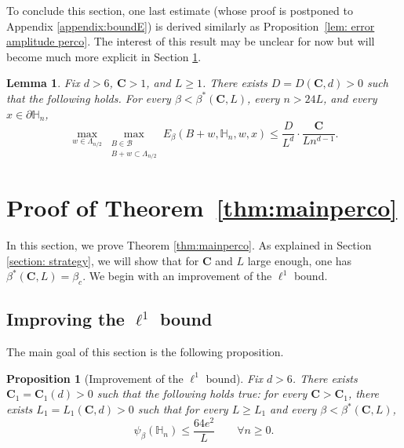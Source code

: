 \documentclass[11pt,a4paper]{article}
\numberwithin{equation}{section}
\theoremstyle{plain}
\newtheorem{Lem}[Thm]{Lemma}
\newtheorem{Prop}[Thm]{Proposition}
\theoremstyle{definition}
\newcommand\bfC{\mathbf{C}}
\begin{document}
To conclude this section, one last estimate (whose proof is postponed to Appendix \ref{appendix:boundE}) is derived similarly as Proposition~\ref{lem: error amplitude perco}. The interest of this result may be unclear for now but will become much more explicit in Section \ref{section: proof mainperco}.
\begin{Lem}\label{lem: estimate E(x)} Fix $d>6$, $\bfC>1$, and $L\geq 1$. 
There exists $D=D(\bfC,d)>0$ such that the following holds. For every $\beta<\beta^*(\bfC,L)$, every $n> 24L$, and every $x\in \partial\mathbb H_n$,
\begin{equation}
\max_{w\in \Lambda_{n/2}}\max_{\substack{B\in \mathcal B\\B+w\subset \Lambda_{n/2}}}E_\beta(B+w,\mathbb H_n,w,x)\leq \frac{D}{L^{d}}\cdot\frac{\bfC}{Ln^{d-1}}.
\end{equation}
	
\end{Lem}


\section{Proof of Theorem~\ref{thm:mainperco}}\label{section: proof mainperco}\label{sec:3}

In this section, we prove Theorem \ref{thm:mainperco}. As explained in Section \ref{section: strategy}, we will show that for $\bfC$ and $L$ large enough, one has $\beta^*(\bfC,L)=\beta_c$. We begin with an improvement of the $\ell^1$ bound.

\subsection{Improving the $\ell^1$ bound}

The main goal of this section is the following proposition. 

\begin{Prop}[Improvement of the $\ell^1$ bound]\label{prop: improved l^1 perco} Fix $d>6$. There exists $\bfC_1=\bfC_1(d)>0$ such that the following holds true: for every $\bfC>\bfC_1$, there exists $L_1=L_1(\bfC,d)>0$ such that for every $L\geq L_1$ and every $\beta<\beta^*(\bfC,L)$,
\begin{equation}
	\psi_\beta(\mathbb H_n)\leq \frac{64e^2}{L}\qquad \forall n\geq 0.
\end{equation}
\end{Prop}
\end{document}
